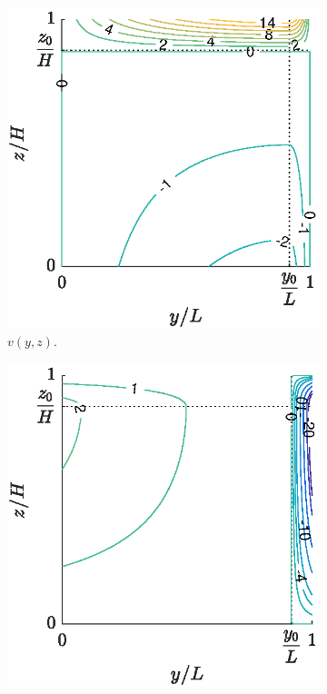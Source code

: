 \begin{figure}[ht]
	\centering
	\begin{subfigure}[t]{0.4\textwidth}
		\includegraphics[width=\textwidth]{fig/overturner/V_samecaxis.eps}
		\caption{$v(y,z)$.}
		\label{fig:v_overturner}
	\end{subfigure}
	\begin{subfigure}[t]{0.4\textwidth}
		\includegraphics[width=\textwidth]{fig/overturner/W_samecaxis.eps}

\end{subfigure}
\end{figure}
